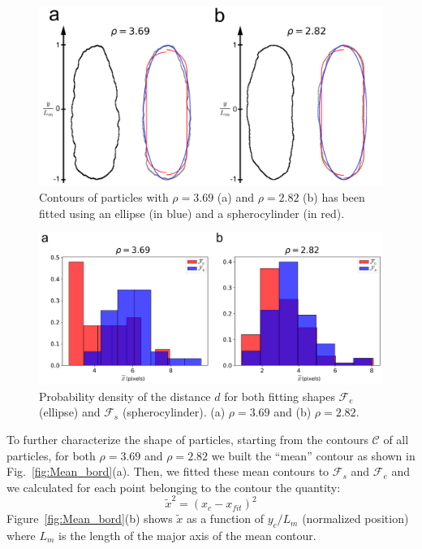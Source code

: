 \documentclass[aip,graphicx]{revtex4-1} %
\begin{document}

\begin{figure}
    \centering
    \includegraphics[width=0.95\columnwidth]{Part fit.png}
    \caption{Contours of particles with $\rho = 3.69$ (a) and $\rho = 2.82$ (b) has been fitted using an ellipse (in blue) and a 
    spherocylinder (in red).}\label{fig:Part_fit}
\end{figure}

\begin{figure}
    \centering
    \includegraphics[width=0.95\columnwidth]{Mean_dist.png}
    \caption{Probability density of the distance $d$ for both fitting shapes $\mathcal{F}_e$ (ellipse) and $\mathcal{F}_s$ 
      (spherocylinder). (a) $\rho = 3.69$ and (b) $\rho = 2.82$.}\label{fig:Mean_dist}
\end{figure}

To further characterize the shape of particles, starting from the contours $\mathcal{C}$ of all particles, for both $\rho=3.69$
and $\rho=2.82$ we built the ``mean'' contour as shown in Fig.~\ref{fig:Mean_bord}(a).
Then, we fitted these mean contours to $\mathcal{F}_s$ and $\mathcal{F}_e$ and we calculated for each point belonging to the 
contour the quantity:
\begin{equation}
  \widetilde{x}^2 = {(x_c - x_{fit})}^2 
\end{equation}
Figure~\ref{fig:Mean_bord}(b) shows $\widetilde{x}$ as a function of $y_c/L_m$ (normalized position) where $L_m$ is the 
length of the major axis of the mean contour.
\end{document}
